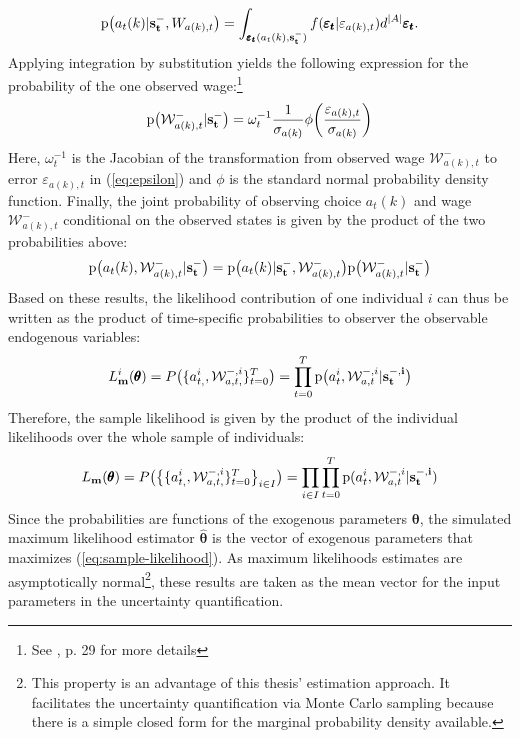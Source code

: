 \noindent
\begin{align}
\text{p}\big(a_t(k) | \bold{s_t^-},W_{a(k),t}\big) = \int_{\pmb{\varepsilon_t}(a_t(k),\bold{s_t^-})} f(\pmb{\varepsilon_t}|\varepsilon_{a(k),t}) d^{|A|} \pmb{\varepsilon_t}.
\end{align}
Applying integration by substitution yields the following expression for the probability of the one observed wage:\footnote{See \cite{Raabe.2019}, p. 29 for more details}
\begin{align}
\text{p}\big(\mathcal{W}^{-}_{a(k),t} | \bold{s_t^-}\big) = \omega_t^{-1} \frac{1}{\sigma_{a(k)}} \phi\bigg(\frac{\varepsilon_{a(k),t}}{\sigma_{a(k)}}\bigg)
\end{align}
Here, $\omega_t^{-1}$ is the Jacobian of the transformation from observed wage $\mathcal{W}^{-}_{a(k),t}$ to error $\varepsilon_{a(k),t}$ in (\ref{eq:epsilon}) and $\phi$ is the standard normal probability density function.
Finally, the joint probability of observing choice $a_t(k)$ and wage $\mathcal{W}^{-}_{a(k),t}$ conditional on the observed states is given by the product of the two probabilities above:
\begin{align}
\text{p}\big(a_t(k),\mathcal{W}^{-}_{a(k),t}|\bold{s_t^-}\big) = \text{p}\big(a_t(k)|\bold{s_t^-}, \mathcal{W}^{-}_{a(k),t}\big)\text{p}\big(\mathcal{W}^{-}_{a(k),t}|\bold{s_t^-}\big)
\end{align}
Based on these results, the likelihood contribution of one individual $i$ can thus be written as the product of time-specific probabilities to observer the observable endogenous variables:
\begin{align}
L^{i}_{\bold{m}}(\pmb{\theta}) = P\big(\{a_{t,}^{i},\mathcal{W}^{-,i}_{a,t,}\}_{t=0}^T\big) = \prod_{t=0}^{T} \text{p}\big(a_t^{i},\mathcal{W}_{a,t}^{-,i}|\bold{s_t^{-,i}}\big)
\end{align}
Therefore, the sample likelihood is given by the product of the individual likelihoods over the whole sample of individuals:
\begin{align} \label{eq:sample-likelihood}
L_{\bold{m}}(\pmb{\theta}) = P\big(\big\{\{a_{t,}^{i},\mathcal{W}^{-,i}_{a,t,}\}_{t=0}^T\big\}_{i \in I}\big) = \prod_{i \in I}\prod_{t=0}^{T} \text{p}(a_t^{i},\mathcal{W}_{a,t}^{-,i}|\bold{s_t^{-,i})}
\end{align}
Since the probabilities are functions of the exogenous parameters $\pmb{\theta}$, the simulated maximum likelihood estimator $\pmb{\hat{\theta}}$ is the vector of exogenous parameters that maximizes (\ref{eq:sample-likelihood}). As maximum likelihoods estimates are asymptotically normal\footnote{This property is an advantage of this thesis' estimation approach. It facilitates the uncertainty quantification via Monte Carlo sampling because there is a simple closed form for the marginal probability density available.}, these results are taken as the mean vector for the input parameters in the uncertainty quantification.

